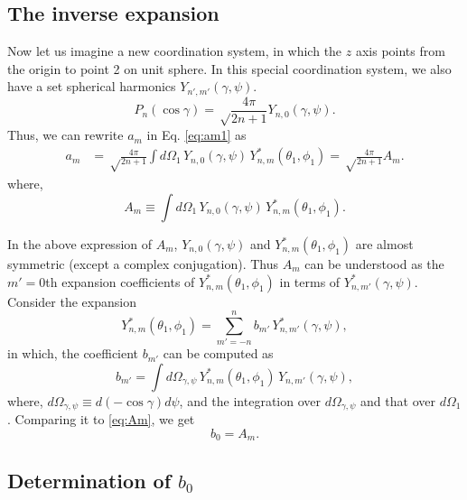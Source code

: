 \documentclass[11pt]{article}
\begin{document}
\subsection{The inverse expansion}



Now let us imagine a new coordination system,
in which the $z$ axis points from the origin to point 2 on unit sphere.
%
In this special coordination system,
we also have a set spherical harmonics $Y_{n', m'}(\gamma, \psi)$.
\[
  P_n(\cos\gamma)
=
\sqrt \frac { 4 \pi } { 2 n + 1 }
  Y_{n, 0}(\gamma, \psi).
\]
Thus, we can rewrite $a_m$ in Eq. \eqref{eq:am1} as
\begin{align}
a_m
&=
\sqrt \frac{4 \pi}{ 2 n + 1 }
\int d\Omega_1 \, Y_{n, 0}(\gamma, \psi) \, Y^*_{n,m}(\theta_1, \phi_1)
=
\sqrt \frac{4 \pi}{ 2 n + 1 } A_m.
\label{eq:am2}
\end{align}
%
where,
\begin{equation}
A_m
\equiv
\int d\Omega_1 \, Y_{n, 0}(\gamma, \psi) \, Y^*_{n,m}(\theta_1, \phi_1).
\label{eq:Am}
\end{equation}


In the above expression of $A_m$,
$Y_{n, 0}(\gamma, \psi)$ and $Y_{n, m}^*(\theta_1, \phi_1)$
are almost symmetric (except a complex conjugation).
%
Thus $A_m$
can be understood as the $m'=0$th expansion coefficients
of $Y_{n, m}^*(\theta_1, \phi_1)$
in terms of $Y_{n, m'}^*(\gamma, \psi)$.
%
Consider the expansion
\begin{equation}
  Y_{n, m}^*(\theta_1, \phi_1)
=
  \sum_{m' = -n}^n b_{m'} \,Y_{n, m'}^*(\gamma, \psi),
  \label{eq:expansion0}
\end{equation}
in which,
the coefficient $b_{m'}$ can be computed as
\begin{equation}
  b_{m'}
=
  \int d \Omega_{\gamma,\psi} \,
  Y_{n, m}^*(\theta_1, \phi_1) \,
  Y_{n, m'}(\gamma, \psi),
  \label{eq:bm}
\end{equation}
where, $d\Omega_{\gamma, \psi} \equiv d(-\cos\gamma) d\psi$,
and the integration over $d\Omega_{\gamma, \psi}$
and that over $d\Omega_1$.
Comparing it to \eqref{eq:Am}, we get
\begin{equation}
  b_0 = A_m.
  \label{eq:b0Am}
\end{equation}



\subsection{Determination of $b_0$}
\end{document}
